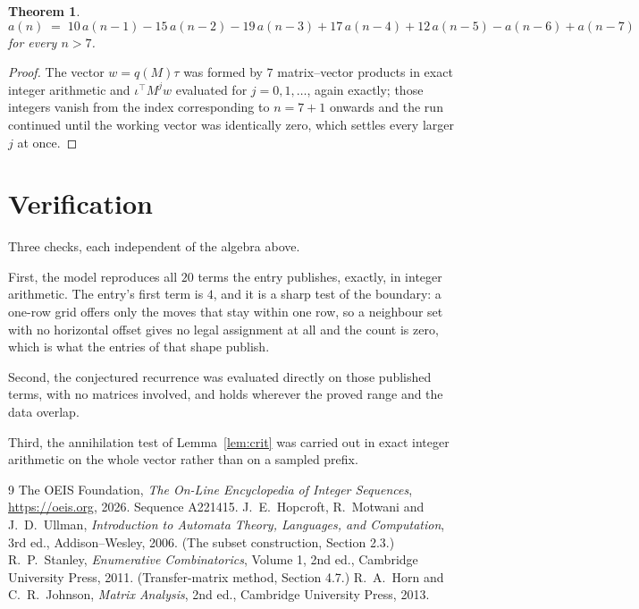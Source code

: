 \documentclass[11pt,a4paper]{article}
\theoremstyle{plain}
\newtheorem{theorem}{Theorem}
\theoremstyle{definition}
\begin{document}
\begin{theorem}
\[
a(n)\;=\;10\,a(n-1) - 15\,a(n-2) - 19\,a(n-3) + 17\,a(n-4) + 12\,a(n-5) - a(n-6) + a(n-7)
\]
for every $n>7$.
\end{theorem}

\begin{proof}
The vector $w=q(M)\tau$ was formed by $7$ matrix--vector products in exact integer
arithmetic and $\iota^{\!\top}M^{j}w$ evaluated for $j=0,1,\dots$, again exactly; those
integers vanish from the index corresponding to $n=7+1$ onwards and the run continued
until the working vector was identically zero, which settles every larger $j$ at once.
\end{proof}

\section{Verification}

Three checks, each independent of the algebra above.

First, the model reproduces all $20$ terms the entry publishes, exactly, in integer
arithmetic. The entry's first term is $4$, and it is a sharp test of the boundary: a
one-row grid offers only the moves that stay within one row, so a neighbour set with no
horizontal offset gives no legal assignment at all and the count is zero, which is what the
entries of that shape publish.

Second, the conjectured recurrence was evaluated directly on those published terms, with no
matrices involved, and holds wherever the proved range and the data overlap.

Third, the annihilation test of Lemma~\ref{lem:crit} was carried out in exact integer
arithmetic on the whole vector rather than on a sampled prefix.

\begin{thebibliography}{9}
 The OEIS Foundation, \emph{The On-Line Encyclopedia of Integer
Sequences}, \url{https://oeis.org}, 2026. Sequence A221415.
 J.~E.~Hopcroft, R.~Motwani and J.~D.~Ullman, \emph{Introduction to Automata
Theory, Languages, and Computation}, 3rd ed., Addison--Wesley, 2006. (The subset
construction, Section 2.3.)
 R.~P.~Stanley, \emph{Enumerative Combinatorics}, Volume 1, 2nd ed.,
Cambridge University Press, 2011. (Transfer-matrix method, Section 4.7.)
 R.~A.~Horn and C.~R.~Johnson, \emph{Matrix Analysis}, 2nd ed., Cambridge
University Press, 2013.
\end{thebibliography}
\end{document}
